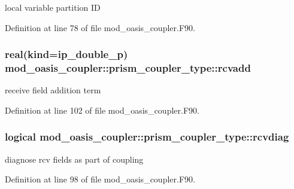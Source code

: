 local variable partition I\+D 



Definition at line 78 of file mod\+\_\+oasis\+\_\+coupler.\+F90.

\hypertarget{structmod__oasis__coupler_1_1prism__coupler__type_adee95ace457db5ccaacc0195f3327277}{
\subsubsection[{rcvadd}]{\setlength{\rightskip}{0pt plus 5cm}real(kind=ip\+\_\+double\+\_\+p) mod\+\_\+oasis\+\_\+coupler\+::prism\+\_\+coupler\+\_\+type\+::rcvadd\hspace{0.3cm}{\ttfamily [private]}}}\label{structmod__oasis__coupler_1_1prism__coupler__type_adee95ace457db5ccaacc0195f3327277}


receive field addition term 



Definition at line 102 of file mod\+\_\+oasis\+\_\+coupler.\+F90.

\hypertarget{structmod__oasis__coupler_1_1prism__coupler__type_a05d7a7317dd4b063ced94cebd4dfedc7}{
\subsubsection[{rcvdiag}]{\setlength{\rightskip}{0pt plus 5cm}logical mod\+\_\+oasis\+\_\+coupler\+::prism\+\_\+coupler\+\_\+type\+::rcvdiag\hspace{0.3cm}{\ttfamily [private]}}}\label{structmod__oasis__coupler_1_1prism__coupler__type_a05d7a7317dd4b063ced94cebd4dfedc7}


diagnose rcv fields as part of coupling 



Definition at line 98 of file mod\+\_\+oasis\+\_\+coupler.\+F90.

